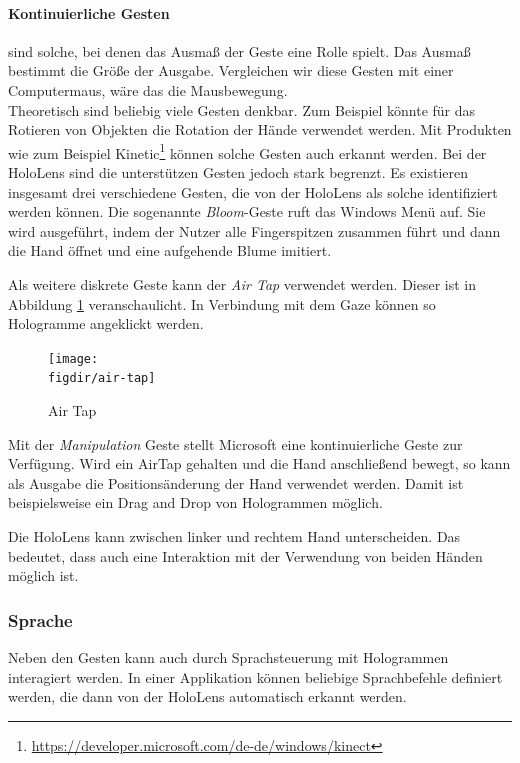 \paragraph{Kontinuierliche Gesten} sind solche, bei denen das Ausmaß der Geste eine Rolle spielt. Das Ausmaß bestimmt die Größe der Ausgabe. Vergleichen wir diese Gesten mit einer Computermaus, wäre das die Mausbewegung.\\

Theoretisch sind beliebig viele Gesten denkbar. Zum Beispiel könnte für das Rotieren von Objekten die Rotation der Hände verwendet werden. Mit Produkten wie zum Beispiel Kinetic\footnote{\url{https://developer.microsoft.com/de-de/windows/kinect}} können solche Gesten auch erkannt werden. Bei der HoloLens sind die unterstützen Gesten jedoch stark begrenzt. Es existieren insgesamt drei verschiedene Gesten, die von der HoloLens als solche identifiziert werden können. Die sogenannte \textit{Bloom}-Geste ruft das Windows Menü auf. Sie wird ausgeführt, indem der Nutzer alle Fingerspitzen zusammen führt und dann die Hand öffnet und eine aufgehende Blume imitiert.

Als weitere diskrete Geste kann der \textit{Air Tap} verwendet werden. Dieser ist in Abbildung \ref{fig:air-tap} veranschaulicht. In Verbindung mit dem Gaze können so Hologramme angeklickt werden.

\begin{figure}[htb]
  \texttt{[image: \\figdir/air-tap]}
  \caption{Air Tap \cite{windows2017gesture}}
  \label{fig:air-tap}
\end{figure}

Mit der \textit{Manipulation} Geste stellt Microsoft eine kontinuierliche Geste zur Verfügung. Wird ein AirTap gehalten und die Hand anschließend bewegt, so kann als Ausgabe die Positionsänderung der Hand verwendet werden. Damit ist beispielsweise ein Drag and Drop von Hologrammen möglich.

Die HoloLens kann zwischen linker und rechtem Hand unterscheiden. Das bedeutet, dass auch eine Interaktion mit der Verwendung von beiden Händen möglich ist.

\subsubsection*{Sprache}
Neben den Gesten kann auch durch Sprachsteuerung mit Hologrammen interagiert werden. In einer Applikation können beliebige Sprachbefehle definiert werden, die dann von der HoloLens automatisch erkannt werden.

